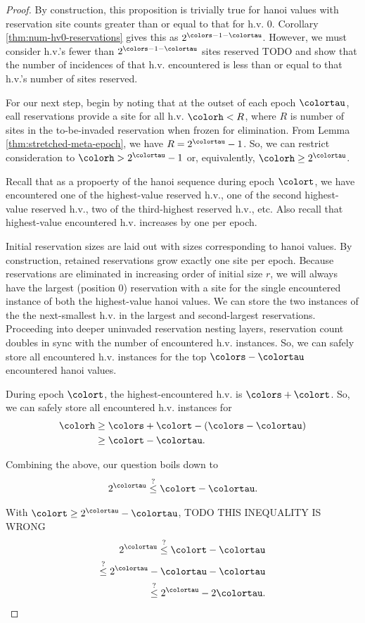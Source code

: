 \begin{proof}
By construction, this proposition is trivially true for hanoi values with reservation site counts greater than or equal to that for h.v. 0.
Corollary \ref{thm:num-hv0-reservations} gives this as $2^{\colors-1-\colortau}$.
However, we must consider h.v.'s fewer than $2^{\colors-1-\colortau}$ sites reserved TODO and show that the number of incidences of that h.v. encountered is less than or equal to that h.v.'s number of sites reserved.

For our next step, begin by noting that at the outset of each epoch $\colortau$, eall reservations provide a site for all h.v. $\colorh < R$, where $R$ is number of sites in the to-be-invaded reservation when frozen for elimination.
From Lemma \ref{thm:stretched-meta-epoch}, we have $R = 2^{\colortau} - 1$.
So, we can restrict consideration to $\colorh > 2^{\colortau} - 1$ or, equivalently, $\colorh \geq 2^{\colortau}$.

Recall that as a propoerty of the hanoi sequence during epoch $\colort$, we have encountered one of the highest-value reserved h.v., one of the second highest-value reserved h.v., two of the third-highest reserved h.v., etc.
Also recall that highest-value encountered h.v. increases by one per epoch.

Initial reservation sizes are laid out with sizes corresponding to hanoi values.
By construction, retained reservations grow exactly one site per epoch.
Because reservations are eliminated in increasing order of initial size $r$, we will always have the largest (position 0) reservation with a site for the single encountered instance of both the highest-value hanoi values.
We can store the two instances of the the next-smallest h.v. in the largest and second-largest reservations.
Proceeding into deeper uninvaded reservation nesting layers, reservation count doubles in sync with the number of encountered h.v. instances.
So, we can safely store all encountered h.v. instances for the top $\colors - \colortau$ encountered hanoi values.

During epoch $\colort$, the highest-encountered h.v. is $\colors + \colort$.
So, we can safely store all encountered h.v. instances for
\begin{align*}
\colorh
&\geq
\colors + \colort - (\colors - \colortau)\\
&\geq
\colort - \colortau.
\end{align*}

Combining the above, our question boils down to
\begin{align*}
2^{\colortau}
\stackrel{?}{\leq} \colort - \colortau.
\end{align*}

With $\colort \geq 2^{\colortau} - \colortau$, TODO THIS INEQUALITY IS WRONG
\begin{align*}
2^{\colortau}
\stackrel{?}{\leq} \colort - \colortau \\
\stackrel{?}{\leq} 2^{\colortau} - \colortau - \colortau \\
\stackrel{?}{\leq} 2^{\colortau} - 2\colortau.
\end{align*}

\end{proof}
